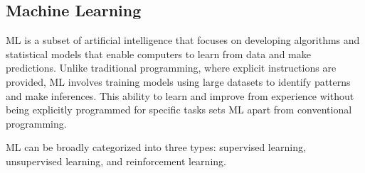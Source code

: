 \subsection{Machine Learning}
ML is a subset of artificial intelligence that focuses on developing algorithms and statistical models that enable computers to learn from data and make predictions. Unlike traditional programming, where explicit instructions are provided, ML involves training models using large datasets to identify patterns and make inferences. This ability to learn and improve from experience without being explicitly programmed for specific tasks sets ML apart from conventional programming.

ML can be broadly categorized into three types: supervised learning, unsupervised learning, and reinforcement learning.

